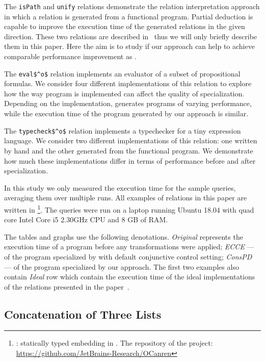 The \lstinline{isPath} and \lstinline{unify} relations demonstrate the relation interpretation approach in which a relation is generated from a functional program.
Partial deduction is capable to improve the execution time of the generated relations in the given direction.
These two relations are described in~\cite{lozov2019relational} thus we will only briefly describe them in this paper.
Here the aim is to study if our approach can help to achieve comparable performance improvement as \ecce.

The \lstinline{eval$^o$} relation implements an evaluator of a subset of propositional formulas.
We consider four different implementations of this relation to explore how the way program is implemented can affect the quality of specialization.
Depending on the implementation, \ecce generates programs of varying performance, while the execution time of the program generated by our approach is similar.

The \lstinline{typecheck$^o$} relation implements a typechecker for a tiny expression language.
We consider two different implementations of this relation: one written by hand and the other generated from the functional program.
We demonstrate how much these implementations differ in terms of performance before and after specialization.

In this study we only measured the execution time for the sample queries, averaging them over multiple runs.
All examples of \mk relations in this paper are written in \oc\footnote{\oc: statically typed \mk embedding in \ocaml. The repository of the project: \url{https://github.com/JetBrains-Research/OCanren}}.
The queries were run on a laptop running Ubuntu 18.04 with quad core Intel Core i5 2.30GHz CPU and 8 GB of RAM.

The tables and graphs use the following denotations.
\emph{Original} represents the execution time of a program before any transformations were applied; \emph{ECCE} --- of the program specialized by \ecce with default conjunctive control setting; \emph{ConsPD} --- of the program specialized by our approach.
The first two examples also contain \emph{Ideal} row which contain the execution time of the ideal implementations of the relations presented in the paper~\cite{de1999conjunctive}.

\subsection{Concatenation of Three Lists}


